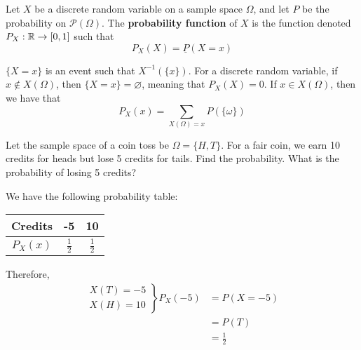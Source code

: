 \documentclass{article}
\begin{document}
	\begin{defn}
		Let $X$ be a discrete random variable on a sample space $\Omega$, and let $P$ be the probability on $\mathcal{P}(\Omega)$. The \textbf{probability function} of $X$ is the function denoted $P_X: \mathbb{R} \to [0,1]$ such that
		\vfill
		$$ P_X(X) = \underline{P}(X=x)$$
		\pagebreak
		\begin{rem}
			$\{X=x\}$ is an event such that $X^{-1} (\{ x\})$. For a discrete random variable, if $x \notin X(\Omega)$, then $\{X=x\} = \varnothing$, meaning that $P_X(X)=0$. If $x \in X(\Omega)$, then we have that
			$$ P_X(x) = \sum_{X(\Omega) = x} P(\{\omega\})$$
		\end{rem}
	\end{defn}
	\begin{exmp}
		Let the sample space of a coin toss be $\Omega = \{H, T\}$. For a fair coin, we earn 10 credits for heads but lose 5 credits for tails. Find the probability. What is the probability of losing 5 credits?
		\begin{sol}
			We have the following probability table:
			\begin{table}[h]
				\begin{tabular}{c|c|c|}
					Credits  & -5        & 10        \\ \hline
					$P_X(x)$ & $\frac12$ & $\frac12$
				\end{tabular}
			\end{table}
		
		\noindent
		Therefore, 
		\begin{align*}
			\left. \begin{array}{c}
			X(T) =-5 \\
			X(H) = 10
			\end{array} \right\} P_X(-5) &= P(X=-5) \\
			&= P(T) \\
			&= \frac12
		\end{align*}
		\end{sol}
	\end{exmp}
\end{document}
